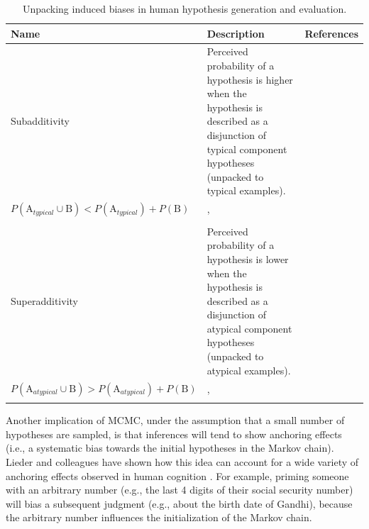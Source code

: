 \begin{table}%
\centering
\caption{Unpacking induced biases in human hypothesis generation and evaluation.}
\label{tab:biases}
\begin{tabular}{p{}>{\raggedright}p{}p{}}
\toprule
\textbf{Name}&\textbf{Description}& \textbf{References}\\
\midrule
Subadditivity& Perceived probability of a hypothesis is higher when the hypothesis is described as a disjunction of typical component hypotheses (unpacked to typical examples). \\
$P (\text{A}_{typical} \cup \text{B}) < P (\text{A}_{typical}) + P(\text{B})$ & \citet{fox1998belief}, \citet{tversky94} \\\\
Superadditivity& Perceived probability of a hypothesis is lower when the hypothesis is described as a disjunction of atypical component hypotheses (unpacked to atypical examples). \\
$P (\text{A}_{atypical} \cup \text{B}) > P (\text{A}_{atypical}) + P(\text{B})$ & \citet{sloman04}, \citet{hadjichristidis1999opening} \\\\ 
\bottomrule
\end{tabular}
\end{table}

Another implication of MCMC, under the assumption that a small number of hypotheses are sampled, is that inferences will tend to show anchoring effects (i.e., a systematic bias towards the initial hypotheses in the Markov chain). Lieder and colleagues have shown how this idea can account for a wide variety of anchoring effects observed in human cognition \citep{lieder2012burn,lieder2017empirical}. For example, priming someone with an arbitrary number (e.g., the last 4 digits of their social security number) will bias a subsequent judgment (e.g., about the birth date of Gandhi), because the arbitrary number influences the initialization of the Markov chain.


